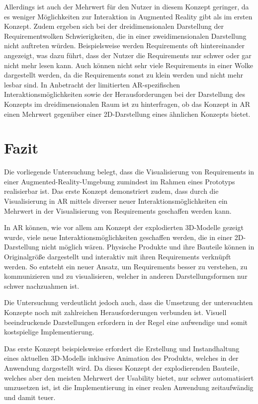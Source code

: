 Allerdings ist auch der Mehrwert für den Nutzer in diesem Konzept geringer, da es weniger Möglichkeiten zur Interaktion in Augmented Reality gibt als im ersten Konzept.
Zudem ergeben sich bei der dreidimensionalen Darstellung der Requirementwolken Schwierigkeiten, die in einer zweidimensionalen Darstellung nicht auftreten würden.
Beispielsweise werden Requirements oft hintereinander angezeigt, was dazu führt, dass der Nutzer die Requirements nur schwer oder gar nicht mehr lesen kann.
Auch können nicht sehr viele Requirements in einer Wolke dargestellt werden, da die Requirements sonst zu klein werden und nicht mehr lesbar sind.
In Anbetracht der limitierten AR-spezifischen Interaktionsmöglichkeiten sowie der Herausforderungen bei der Darstellung des Konzepts im dreidimensionalen Raum ist zu hinterfragen, ob das Konzept in AR einen Mehrwert gegenüber einer 2D-Darstellung eines ähnlichen Konzepts bietet.


\newpage

\section{Fazit}

Die vorliegende Untersuchung belegt, dass die Visualisierung von Requirements in einer Augmented-Reality-Umgebung zumindest im Rahmen eines Prototyps realisierbar ist.
Das erste Konzept demonstriert zudem, dass durch die Visualisierung in AR mittels diverser neuer Interaktionsmöglichkeiten ein Mehrwert in der Visualisierung von Requirements geschaffen werden kann.

In AR können, wie vor allem am Konzept der explodierten 3D-Modelle gezeigt wurde, viele neue Interaktionsmöglichkeiten geschaffen werden, die in einer 2D-Darstellung nicht möglich wären.
Physische Produkte und ihre Bauteile können in Originalgröße dargestellt und interaktiv mit ihren Requirements verknüpft werden.
So entsteht ein neuer Ansatz, um Requirements besser zu verstehen, zu kommunizieren und zu visualisieren, welcher in anderen Darstellungsformen nur schwer nachzuahmen ist.

Die Untersuchung verdeutlicht jedoch auch, dass die Umsetzung der untersuchten Konzepte noch mit zahlreichen Herausforderungen verbunden ist.
Visuell beeindruckende Darstellungen erfordern in der Regel eine aufwendige und somit kostspielige Implementierung.

Das erste Konzept beispielsweise erfordert die Erstellung und Instandhaltung eines aktuellen 3D-Modells inklusive Animation des Produkts, welches in der Anwendung dargestellt wird.
Da dieses Konzept der explodierenden Bauteile, welches aber den meisten Mehrwert der Usability bietet, nur schwer automatisiert umzusetzen ist, ist die Implementierung in einer realen Anwendung zeitaufwändig und damit teuer.

